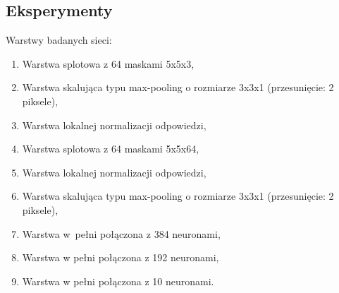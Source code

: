 \documentclass[xcolor=dvipsnames]{beamer}
\begin{document}
\subsection{Eksperymenty}
\begin{frame}
    Warstwy badanych sieci:
    \begin{enumerate}
        \item Warstwa splotowa z 64 maskami 5x5x3,
        \item Warstwa skalująca typu max-pooling o rozmiarze 3x3x1 (przesunięcie: 2 piksele),
        \item Warstwa lokalnej normalizacji odpowiedzi,
        \item Warstwa splotowa z 64 maskami 5x5x64,
        \item Warstwa lokalnej normalizacji odpowiedzi,
        \item Warstwa skalująca typu max-pooling o rozmiarze 3x3x1 (przesunięcie: 2 piksele),
        \item Warstwa w~pełni połączona z 384 neuronami,
        \item Warstwa w pełni połączona z 192 neuronami,
        \item Warstwa w pełni połączona z 10 neuronami.
    \end{enumerate}
\end{frame}
\end{document}

